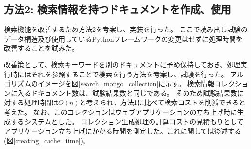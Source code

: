 
\clearpage
\subsection{方法2: 検索情報を持つドキュメントを作成、使用}

検索機能を改善するため方法2を考案し、実装を行った。
ここで読み出し試験のデータ構造及び使用しているPythonフレームワークの変更はせずに処理時間を改善することを試みた。

改善策として、検索キーワードを別のドキュメントに予め保持しておき、処理実行時にはそれを参照することで検索を行う方法を考案し、試験を行った。
アルゴリズムのイメージを図\ref{search_mongo_collection}に示す。
検索情報コレクションに入るドキュメント数は、試験結果数と同じである。
そのため試験結果数に対する処理時間は$O(n)$と考えられ、方法1に比べて検索コストを削減できると考えた。
なお、このコレクションはウェブアプリケーションの立ち上げ時に生成するシステムとした。
コレクション生成処理の計算コストの見積もりとしてアプリケーション立ち上げにかかる時間を測定した。これに関しては後述する(図\ref{creating_cache_time})。


